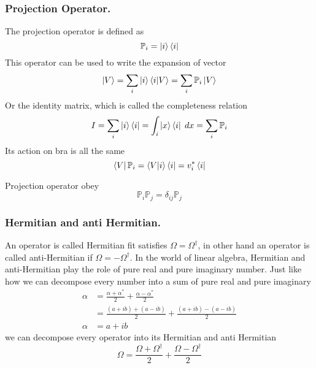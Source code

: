 \documentclass[../main.tex]{subfiles}
\begin{document}
\subsubsection{Projection Operator.}
The projection operator is defined as
\begin{equation*}
	\mathbb{P}_i=\ket{i}\bra{i}
\end{equation*}
This operator can be used to write the expansion of vector
\begin{equation*}
	\ket{V}=\sum_i \ket{i}\braket{i|V}=\sum_i \mathbb{P}_i \ket{V}
\end{equation*}
Or the identity matrix, which is called the completeness relation
\begin{equation*}
	{I}=\sum_i \ket{i}\bra{i}=\int_i \ket{x}\bra{i}\;dx=\sum_i \mathbb{P}_i
\end{equation*}
Its action on bra is all the same
\begin{equation*}
	\bra{V}\mathbb{P}_i=\braket{V|i}\bra{i}=v_i^*\bra{i}
\end{equation*}

Projection operator obey
\begin{equation*}
	\mathbb{P}_i\mathbb{P}_j=\delta_{ij}\mathbb{P}_j
\end{equation*}

\subsubsection{Hermitian and anti Hermitian.}
An operator is called Hermitian fit satisfies $\Omega=\Omega ^\dagger$, in other hand an operator is called anti-Hermitian if $\Omega=-\Omega ^\dagger$.
In the world of linear algebra, Hermitian and anti-Hermitian play the role of pure real and pure imaginary number.
Just like how we can decompose every number into a sum of pure real and pure imaginary
\begin{align*}
	\alpha & =\frac{\alpha+\alpha ^*}{2}+\frac{\alpha-\alpha ^*}{2} \\
	       & =\frac{(a+ib)+(a-ib)}{2}+\frac{(a+ib)-(a-ib)}{2}       \\
	\alpha & =a+ib
\end{align*}
we can decompose every operator into its Hermitian and anti Hermitian
\begin{equation*}
	\Omega=\frac{\Omega+\Omega ^\dagger}{2}+\frac{\Omega-\Omega ^\dagger}{2}
\end{equation*}
\end{document}
